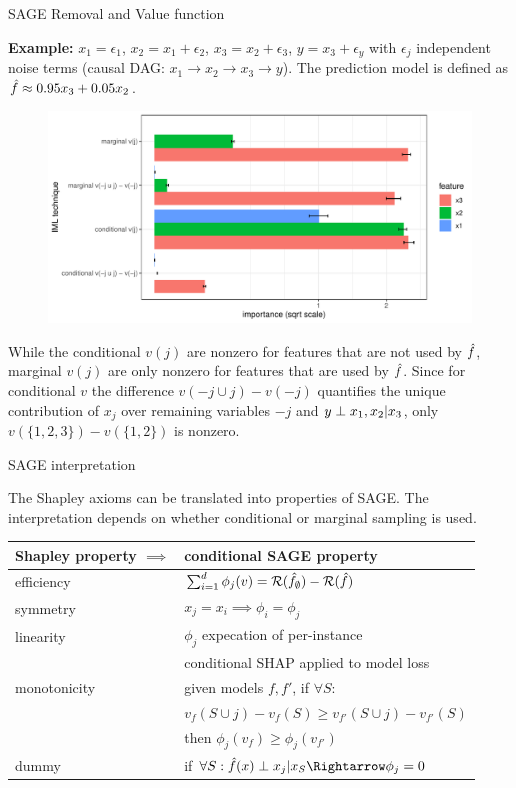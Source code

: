\documentclass[11pt,compress,t,notes=noshow, aspectratio=169, xcolor=table]{beamer}
\begin{document}
\begin{frame}{SAGE Removal and Value function}

\textbf{Example:} $x_1 = \epsilon_1$, $x_2 = x_1 + \epsilon_2$, $x_3 = x_2 + \epsilon_3$, $y = x_3 + \epsilon_y$ with $\epsilon_j$ independent noise terms (causal DAG: $x_1 \rightarrow x_2 \rightarrow x_3 \rightarrow y$). The prediction model is defined as  $\fh \approx 0.95 x_3 + 0.05 x_2$. 
%
\begin{figure}
  \includegraphics[width=0.6\linewidth]{figure_man/sage_variants}
\end{figure}
%
While the conditional $v(j)$ are nonzero for features that are not used by $\fh$, marginal $v(j)$ are only nonzero for features that are used by $\fh$. 
Since for conditional $v$ the difference $v(-j \cup j) - v(-j)$ quantifies the unique contribution of $x_j$ over remaining variables $-j$ and $y \indep x_1, x_2 | x_3$, only $v(\{1,2,3\}) - v(\{1, 2\})$ is nonzero.
%
\end{frame}

\begin{frame}{SAGE interpretation}

The Shapley axioms can be translated into properties of SAGE. The interpretation depends on whether conditional or marginal sampling is used.
%
\begin{table}
  \centering
  \begin{tabular}{l | l }
  Shapley property $\implies$ & conditional SAGE property \\
  \hline
  efficiency & $\sum_{i=1}^d \phi_j(v) = \risk(\fh_\emptyset) - \risk(\fh)$\\
  symmetry & $x_j = x_i \implies \phi_i = \phi_j$ \\
  linearity & $\phi_j$ expecation of per-instance\\
  & conditional SHAP applied to model loss\\
  monotonicity & given models $f, f'$, if  $\forall S:$\\
  &$v_f(S \cup j) - v_f(S) \geq v_{f'}(S \cup j) - v_{f'}(S)$ \\
  &then $\phi_j(v_f) \geq \phi_j(v_{f'})$\\
  dummy & if $\forall S: \fh(x) \indep x_j | x_S \Rightarrow \phi_j = 0$
  \end{tabular}
\end{table}

\end{frame}
\end{document}
